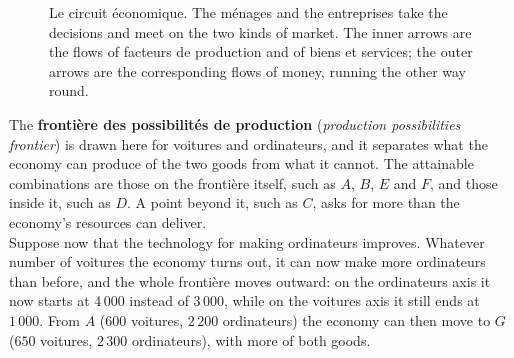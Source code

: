 \begin{figure}[h!]
  \caption*{\small Le circuit économique. The ménages and the entreprises take the
  decisions and meet on the two kinds of market. The inner arrows are the flows of
  facteurs de production and of biens et services; the outer arrows are the
  corresponding flows of money, running the other way round.}
\end{figure}

The \textbf{frontière des possibilités de production} (\textit{production
possibilities frontier}) is drawn here for voitures and ordinateurs, and it
separates what the economy can produce of the two goods from what it cannot. The
attainable combinations are those on the frontière itself, such as $A$, $B$, $E$
and $F$, and those inside it, such as $D$. A point beyond it, such as $C$, asks for
more than the economy's resources can deliver.\\

Suppose now that the technology for making ordinateurs improves. Whatever number of
voitures the economy turns out, it can now make more ordinateurs than before, and
the whole frontière moves outward: on the ordinateurs axis it now starts at
$4\,000$ instead of $3\,000$, while on the voitures axis it still ends at $1\,000$.
From $A$ ($600$ voitures, $2\,200$ ordinateurs) the economy can then move to $G$
($650$ voitures, $2\,300$ ordinateurs), with more of both goods.\\


